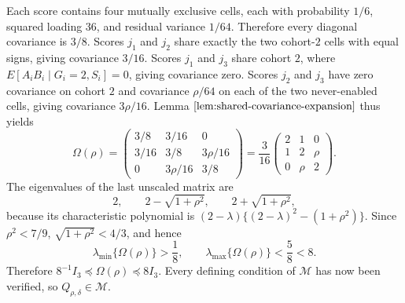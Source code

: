 Each score contains four mutually exclusive cells, each with probability \(1/6\), squared loading \(36\), and residual variance \(1/64\). Therefore every diagonal covariance is \(3/8\). Scores \(j_1\) and \(j_2\) share exactly the two cohort-\(2\) cells with equal signs, giving covariance \(3/16\). Scores \(j_1\) and \(j_3\) share cohort \(2\), where \(E[A_iB_i\mid G_i=2,S_i]=0\), giving covariance zero. Scores \(j_2\) and \(j_3\) have zero covariance on cohort \(2\) and covariance \(\rho/64\) on each of the two never-enabled cells, giving covariance \(3\rho/16\). Lemma \(\ref{lem:shared-covariance-expansion}\) thus yields
\[
 \Omega(\rho)=
 \begin{pmatrix}
 3/8&3/16&0\\
 3/16&3/8&3\rho/16\\
 0&3\rho/16&3/8
 \end{pmatrix}
 =\frac3{16}
 \begin{pmatrix}
 2&1&0\\
 1&2&\rho\\
 0&\rho&2
 \end{pmatrix}.
\]
The eigenvalues of the last unscaled matrix are
\[
 2,
 \qquad 2-\sqrt{1+\rho^2},
 \qquad 2+\sqrt{1+\rho^2},
\]
because its characteristic polynomial is \((2-\lambda)\{(2-\lambda)^2-(1+\rho^2)\}\). Since \(\rho^2<7/9\), \(\sqrt{1+\rho^2}<4/3\), and hence
\[
 \lambda_{\min}\{\Omega(\rho)\}>\frac18,
 \qquad
 \lambda_{\max}\{\Omega(\rho)\}<\frac58<8.
\]
Therefore \(8^{-1}I_3\preceq\Omega(\rho)\preceq8I_3\). Every defining condition of \(\mathcal M\) has now been verified, so \(Q_{\rho,\delta}\in\mathcal M\).

